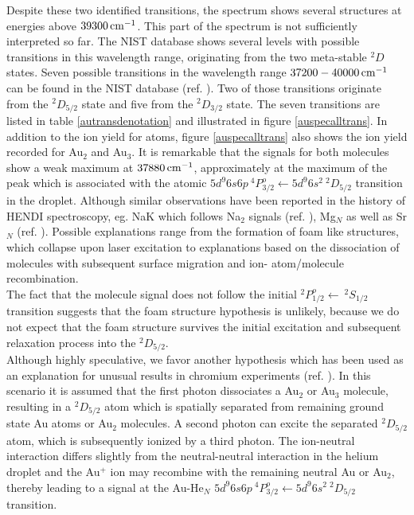 \documentclass[parskip,12pt,headsepline,a4paper] {scrbook}
\begin{document}
Despite these two identified transitions, the spectrum shows several structures at energies above $\unit[39300]{cm^{-1}}$. This part of the spectrum is not sufficiently interpreted so far. The NIST database shows several levels with possible transitions in this wavelength range, originating from the two meta-stable $^2D$ states. Seven possible transitions in the wavelength range $\unit[37200-40000]{cm^{-1}}$ can be found in the NIST database (ref. \cite{nist}). Two of those transitions originate from the $^2D_{5/2}$ state and five from the $^2D_{3/2}$ state. The seven transitions are listed in table \ref{autransdenotation} and illustrated in figure \ref{auspecalltrans}. %
In addition to the ion yield for atoms, figure \ref{auspecalltrans} also shows the ion yield recorded for Au$_2$ and Au$_3$. It is remarkable that the signals for both molecules show a weak maximum at $\unit[37880]{cm^{-1}}$, approximately at the maximum of the peak which is associated with the atomic $5d^9 6s 6p \ ^4P^o_{3/2} \leftarrow 5d^9 6s^2 \ ^2D_{5/2}$ transition in the droplet. Although similar observations have been reported in the history of HENDI spectroscopy, eg. NaK which follows Na$_2$ signals (ref. \cite{higgins}), Mg$_N$ as well as Sr$_N$ (ref. \cite{bunermann-doc}). Possible explanations range from the formation of foam like structures, which collapse upon laser excitation to explanations based on the dissociation of molecules with subsequent surface migration and ion- atom/molecule recombination. \\
The fact that the molecule signal does not follow the initial $^2P^o_{1/2} \leftarrow \ ^2S_{1/2}$ transition suggests that the foam structure hypothesis is unlikely, because we do not expect that the foam structure survives the initial excitation and subsequent relaxation process into the $^2D_{5/2}$. \\
Although highly speculative, we favor another hypothesis which has been used as an explanation for unusual results in chromium experiments (ref. \cite{paperkautschkoch}). In this scenario it is assumed that the first photon dissociates a Au$_2$ or Au$_3$ molecule, resulting in a $^2D_{5/2}$ atom which is spatially separated from remaining ground state Au atoms or Au$_2$ molecules. A second photon can excite the separated $^2D_{5/2}$ atom, which is subsequently ionized by a third photon. The ion-neutral interaction differs slightly from the neutral-neutral interaction in the helium droplet and the Au$^+$ ion may recombine with the remaining neutral Au or Au$_2$, thereby leading to a signal at the Au-He$_N$ $5d^9 6s 6p \ ^4P^o_{3/2} \leftarrow 5d^9 6s^2 \ ^2D_{5/2}$ transition.
\end{document}
